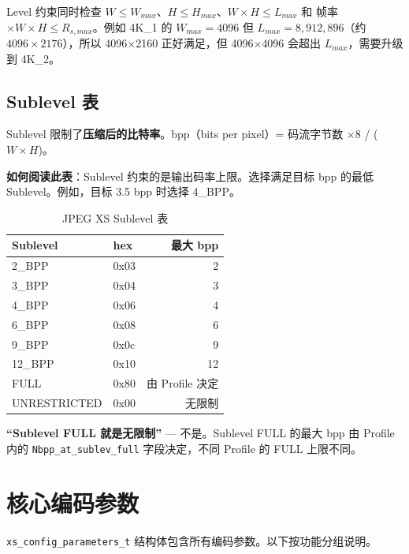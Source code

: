 \begin{engineeringnote}[title={Level 的四个约束缺一不可}]
Level 约束同时检查 $W \leq W_{max}$、$H \leq H_{max}$、$W \times H \leq L_{max}$ 和 帧率$\times W \times H \leq R_{s,max}$。例如 4K\_1 的 $W_{max} = 4096$ 但 $L_{max} = 8{,}912{,}896$（约 $4096 \times 2176$），所以 4096$\times$2160 正好满足，但 4096$\times$4096 会超出 $L_{max}$，需要升级到 4K\_2。
\end{engineeringnote}

\subsection{Sublevel 表}

Sublevel 限制了\textbf{压缩后的比特率}。bpp（bits per pixel）= 码流字节数 $\times 8$ / ($W \times H$)。

\medskip
\textbf{如何阅读此表}：Sublevel 约束的是输出码率上限。选择满足目标 bpp 的最低 Sublevel。例如，目标 3.5 bpp 时选择 4\_BPP。

\begin{table}[H]
\centering
\caption{JPEG XS Sublevel 表}
\label{tab:sublevel-table}
\begin{tabular}{@{}llr@{}}
\toprule
Sublevel & hex & 最大 bpp \\
\midrule
2\_BPP & 0x03 & 2 \\
3\_BPP & 0x04 & 3 \\
4\_BPP & 0x06 & 4 \\
6\_BPP & 0x08 & 6 \\
9\_BPP & 0x0c & 9 \\
12\_BPP & 0x10 & 12 \\
FULL & 0x80 & 由 Profile 决定 \\
UNRESTRICTED & 0x00 & 无限制 \\
\bottomrule
\end{tabular}
\end{table}

\begin{misunderstanding}
\textbf{``Sublevel FULL 就是无限制''} --- 不是。Sublevel FULL 的最大 bpp 由 Profile 内的 \texttt{Nbpp\_at\_sublev\_full} 字段决定，不同 Profile 的 FULL 上限不同。
\end{misunderstanding}

\section{核心编码参数}

\texttt{xs\_config\_parameters\_t} 结构体包含所有编码参数。以下按功能分组说明。

